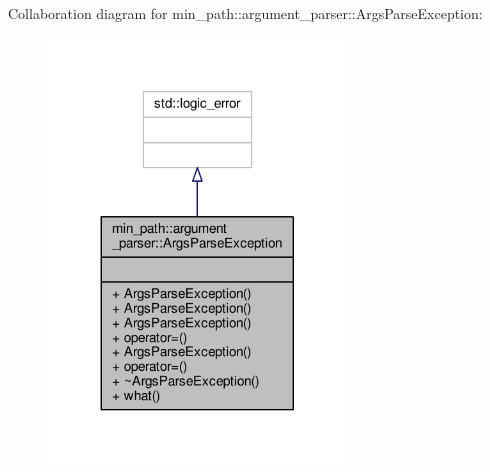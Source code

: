 Collaboration diagram for min\+\_\+path\+:\+:argument\+\_\+parser\+:\+:Args\+Parse\+Exception\+:
\nopagebreak
\begin{figure}[H]
\begin{center}
\leavevmode
\includegraphics[width=224pt]{d9/db3/a00066}
\end{center}
\end{figure}
